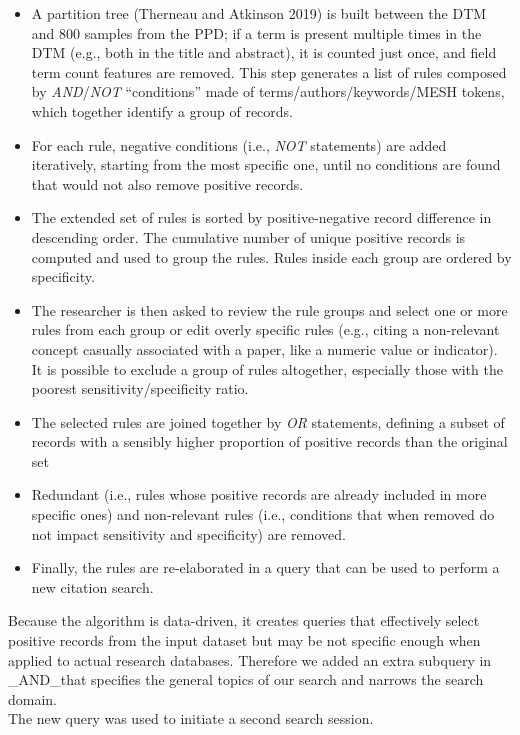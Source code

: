 \documentclass{article}
\providecommand{\tightlist}{%
  \setlength{\itemsep}{0pt}\setlength{\parskip}{0pt}}
\begin{document}
\begin{itemize}
\tightlist
\item
  A partition tree (Therneau and Atkinson 2019) is built between the DTM
  and 800 samples from the PPD; if a term is present multiple times in
  the DTM (e.g., both in the title and abstract), it is counted just
  once, and field term count features are removed. This step generates a
  list of rules composed by \emph{AND}/\emph{NOT} ``conditions'' made of
  terms/authors/keywords/MESH tokens, which together identify a group of
  records.
\item
  For each rule, negative conditions (i.e., \emph{NOT} statements) are
  added iteratively, starting from the most specific one, until no
  conditions are found that would not also remove positive records.
\item
  The extended set of rules is sorted by positive-negative record
  difference in descending order. The cumulative number of unique
  positive records is computed and used to group the rules. Rules inside
  each group are ordered by specificity.
\item
  The researcher is then asked to review the rule groups and select one
  or more rules from each group or edit overly specific rules (e.g.,
  citing a non-relevant concept casually associated with a paper, like a
  numeric value or indicator). It is possible to exclude a group of
  rules altogether, especially those with the poorest
  sensitivity/specificity ratio.
\item
  The selected rules are joined together by \emph{OR} statements,
  defining a subset of records with a sensibly higher proportion of
  positive records than the original set
\item
  Redundant (i.e., rules whose positive records are already included in
  more specific ones) and non-relevant rules (i.e., conditions that when
  removed do not impact sensitivity and specificity) are removed.
\item
  Finally, the rules are re-elaborated in a query that can be used to
  perform a new citation search.
\end{itemize}

Because the algorithm is data-driven, it creates queries that
effectively select positive records from the input dataset but may be
not specific enough when applied to actual research databases. Therefore
we added an extra subquery in \_AND\_that specifies the general topics
of our search and narrows the search domain.\\
The new query was used to initiate a second search session.
\end{document}
